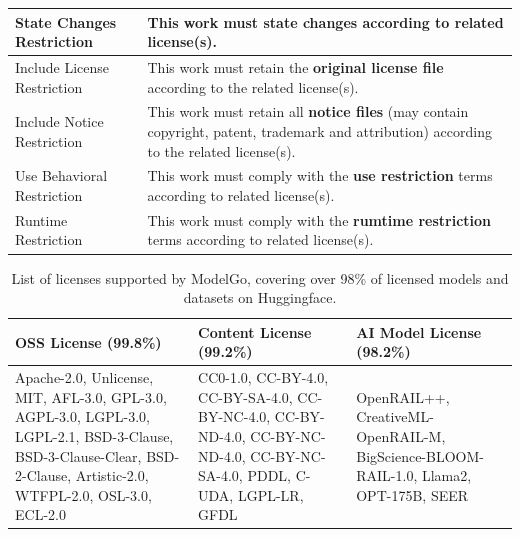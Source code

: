 \begin{table}[t]
\begin{tabular}{|p{3.3cm}|p{4.3cm}|}
    State Changes Restriction & This work must \textbf{state changes} according to related license(s). \\ \hline
    Include License Restriction & This work must retain the \textbf{original license file} according to the related license(s). \\ \hline
    Include Notice Restriction & This work must retain all \textbf{notice files} (may contain copyright, patent, trademark and attribution) according to the related license(s). \\ \hline
    Use Behavioral Restriction & This work must comply with the \textbf{use restriction} terms according to related license(s). \\ \hline
    Runtime Restriction & This work must comply with the \textbf{rumtime restriction} terms according to related license(s). \\ \hline

    \end{tabular}
\end{table}

\begin{table}[t]
    \caption{List of licenses supported by ModelGo, covering over 98\% of licensed models and datasets on Huggingface.}
    \scriptsize
    \label{tab:list}
    \begin{tabular}{|p{2.45cm}|p{2.45cm}|p{2.45cm}|}
    \hline
    \rowcolor[gray]{.8}
    \textbf{OSS License} (99.8\%) & \textbf{Content License} (99.2\%) & \textbf{AI Model License} (98.2\%)\\ \hline
    Apache-2.0, Unlicense, MIT, AFL-3.0, GPL-3.0, AGPL-3.0, LGPL-3.0, LGPL-2.1, BSD-3-Clause, BSD-3-Clause-Clear, BSD-2-Clause, Artistic-2.0, WTFPL-2.0, OSL-3.0, ECL-2.0
    &
    CC0-1.0, CC-BY-4.0, CC-BY-SA-4.0, CC-BY-NC-4.0, CC-BY-ND-4.0, CC-BY-NC-ND-4.0, CC-BY-NC-SA-4.0, PDDL, C-UDA, LGPL-LR, GFDL
    & 
    OpenRAIL++, CreativeML-OpenRAIL-M, BigScience-BLOOM-RAIL-1.0, Llama2, OPT-175B, SEER
    \\ \hline

    \end{tabular}
\end{table}


